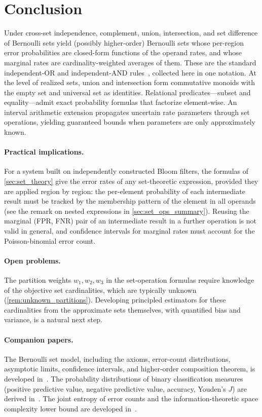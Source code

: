 
\section{Conclusion}
\label{sec:conclusion}

Under cross-set independence, complement, union, intersection, and set difference of Bernoulli sets yield (possibly higher-order) Bernoulli sets whose per-region error probabilities are closed-form functions of the operand rates, and whose marginal rates are cardinality-weighted averages of them.
These are the standard independent-OR and independent-AND rules~\cite{broderMitzenmacher2004,parker1975,dalvi2007}, collected here in one notation.
At the level of realized sets, union and intersection form commutative monoids with the empty set and universal set as identities.
Relational predicates---subset and equality---admit exact probability formulas that factorize element-wise.
An interval arithmetic extension propagates uncertain rate parameters through set operations, yielding guaranteed bounds when parameters are only approximately known.

\paragraph{Practical implications.}
For a system built on independently constructed Bloom filters, the formulas of \cref{sec:set_theory} give the error rates of any set-theoretic expression, provided they are applied region by region: the per-element probability of each intermediate result must be tracked by the membership pattern of the element in all operands (see the remark on nested expressions in \cref{sec:set_ops_summary}).
Reusing the marginal (FPR, FNR) pair of an intermediate result in a further operation is not valid in general, and confidence intervals for marginal rates must account for the Poisson-binomial error count.

\paragraph{Open problems.}
The partition weights $w_1, w_2, w_3$ in the set-operation formulas require knowledge of the objective set cardinalities, which are typically unknown (\cref{rem:unknown_partitions}).
Developing principled estimators for these cardinalities from the approximate sets themselves, with quantified bias and variance, is a natural next step.

\paragraph{Companion papers.}
The Bernoulli set model, including the axioms, error-count distributions, asymptotic limits, confidence intervals, and higher-order composition theorem, is developed in~\cite{bernoulliSets}.
The probability distributions of binary classification measures (positive predictive value, negative predictive value, accuracy, Youden's $J$) are derived in~\cite{bernoulliMeasures}.
The joint entropy of error counts and the information-theoretic space complexity lower bound are developed in~\cite{bernoulliEntropy}.
